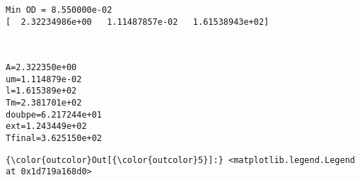 \documentclass[11pt]{article}
\begin{document}
    \begin{Verbatim}[commandchars=\\\{\}]
Min OD = 8.550000e-02
[  2.32234986e+00   1.11487857e-02   1.61538943e+02]

    \end{Verbatim}

    \begin{center}
    \end{center}
    { \hspace*{\fill} \\}
    
    \begin{Verbatim}[commandchars=\\\{\}]
A=2.322350e+00
um=1.114879e-02
l=1.615389e+02
Tm=2.381701e+02
doubpe=6.217244e+01
ext=1.243449e+02
Tfinal=3.625150e+02

    \end{Verbatim}

            \begin{Verbatim}[commandchars=\\\{\}]
{\color{outcolor}Out[{\color{outcolor}5}]:} <matplotlib.legend.Legend at 0x1d719a168d0>
\end{Verbatim}
        
    \begin{center}
    \end{center}
    { \hspace*{\fill} \\}
    
    \begin{center}
    \end{center}
    { \hspace*{\fill} \\}
    
\end{document}
